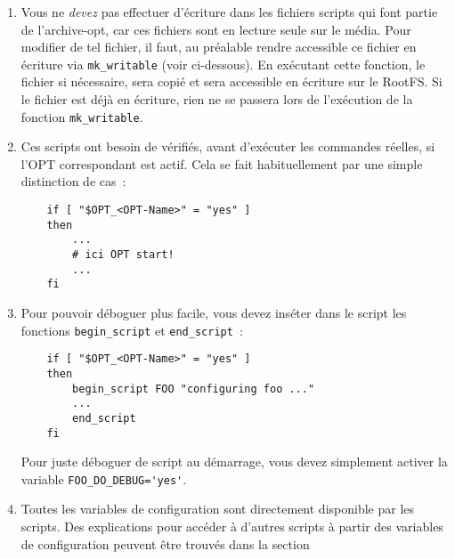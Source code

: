 \begin{enumerate}
    \item Vous ne \emph{devez} pas effectuer d'écriture dans les fichiers
    scripts qui font partie de l'archive-opt, car ces fichiers sont en
    lecture seule sur le média. Pour modifier de tel fichier, il faut, au
    préalable rendre accessible ce fichier en écriture via \texttt{mk\_writable}
	(voir ci-dessous). En exécutant cette fonction, le fichier si nécessaire,
	sera copié et sera accessible en écriture sur le RootFS. Si le fichier est
	déjà en écriture, rien ne se passera lors de l’exécution de la fonction \texttt{mk\_writable}.


    \item Ces scripts ont besoin de vérifiés, avant d'exécuter les commandes
    réelles, si l'OPT correspondant est actif. Cela se fait habituellement par
	une simple distinction de cas~:

\begin{example}
\begin{verbatim}
    if [ "$OPT_<OPT-Name>" = "yes" ]
    then
        ...
        # ici OPT start!
        ...
    fi
\end{verbatim}
\end{example}

    \item Pour pouvoir déboguer plus facile, vous devez inséter dans le script
      les fonctions \texttt{begin\_script} et \texttt{end\_script}~:

\begin{example}
\begin{verbatim}
    if [ "$OPT_<OPT-Name>" = "yes" ]
    then
        begin_script FOO "configuring foo ..."
        ...
        end_script
    fi
\end{verbatim}
\end{example}

    Pour juste déboguer de script au démarrage, vous devez simplement activer
    la variable \verb+FOO_DO_DEBUG='yes'+.

  \item Toutes les variables de configuration sont directement disponible par les scripts.
	Des explications pour accéder à d'autres scripts à partir des variables de configuration
	peuvent être trouvés dans la section 


\end{enumerate}
